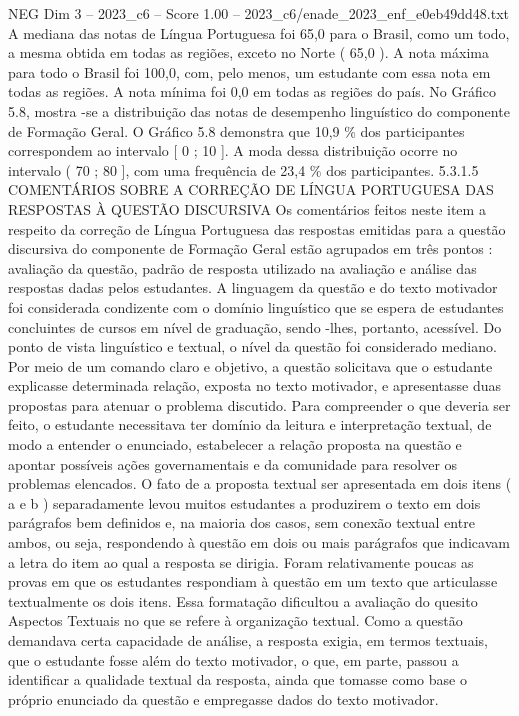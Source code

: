 \begin{textsample}{NEG Dim 3 – 2023\_c6 – Score 1.00 – 2023\_c6/enade\_2023\_enf\_e0eb49dd48.txt}
A mediana das notas de Língua Portuguesa foi 65,0 para o Brasil, como um todo, a mesma obtida em todas as regiões, exceto no Norte ( 65,0 ).
A nota máxima para todo o Brasil foi 100,0, com, pelo menos, um estudante com essa nota em todas as regiões.
A nota mínima foi 0,0 em todas as regiões do país.
No Gráfico 5.8, mostra -se a distribuição das notas de desempenho linguístico do componente de Formação Geral.
O Gráfico 5.8 demonstra que 10,9 \% dos participantes correspondem ao intervalo [ 0 ; 10 ].
A moda dessa distribuição ocorre no intervalo ( 70 ; 80 ], com uma frequência de 23,4 \% dos participantes. 5.3.1.5 COMENTÁRIOS SOBRE A CORREÇÃO DE LÍNGUA PORTUGUESA DAS RESPOSTAS À QUESTÃO DISCURSIVA Os comentários feitos neste item a respeito da correção de Língua Portuguesa das respostas emitidas para a questão discursiva do componente de Formação Geral estão agrupados em três pontos : avaliação da questão, padrão de resposta utilizado na avaliação e análise das respostas dadas pelos estudantes.
A linguagem da questão e do texto motivador foi considerada condizente com o domínio linguístico que se espera de estudantes concluintes de cursos em nível de graduação, sendo -lhes, portanto, acessível.
Do ponto de vista linguístico e textual, o nível da questão foi considerado mediano.
Por meio de um comando claro e objetivo, a questão solicitava que o estudante explicasse determinada relação, exposta no texto motivador, e apresentasse duas propostas para atenuar o problema discutido.
Para compreender o que deveria ser feito, o estudante necessitava ter domínio da leitura e interpretação textual, de modo a entender o enunciado, estabelecer a relação proposta na questão e apontar possíveis ações governamentais e da comunidade para resolver os problemas elencados.
O fato de a proposta textual ser apresentada em dois itens ( a e b ) separadamente levou muitos estudantes a produzirem o texto em dois parágrafos bem definidos e, na maioria dos casos, sem conexão textual entre ambos, ou seja, respondendo à questão em dois ou mais parágrafos que indicavam a letra do item ao qual a resposta se dirigia.
Foram relativamente poucas as provas em que os estudantes respondiam à questão em um texto que articulasse textualmente os dois itens.
Essa formatação dificultou a avaliação do quesito Aspectos Textuais no que se refere à organização textual.
Como a questão demandava certa capacidade de análise, a resposta exigia, em termos textuais, que o estudante fosse além do texto motivador, o que, em parte, passou a identificar a qualidade textual da resposta, ainda que tomasse como base o próprio enunciado da questão e empregasse dados do texto motivador.

\end{textsample}
